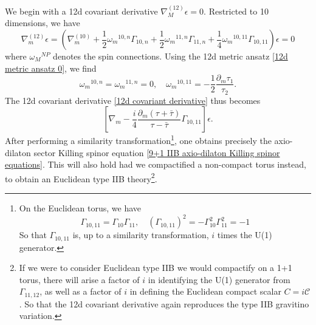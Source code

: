 We begin with a 12d covariant derivative $\nabla^{(12)}_M\epsilon = 0$.
Restricted to 10 dimensions, we have
\begin{equation}
\nabla^{(12)}_m\epsilon
=\left(
\nabla^{(10)}_m
+\frac{1}{2}\omega_m{}^{10,n}\Gamma_{10,n}
+\frac{1}{2}\omega_m{}^{11,n}\Gamma_{11,n}
+\frac{1}{4}\omega_m{}^{10,11}\Gamma_{10,11}\right)\epsilon = 0
\label{12d covariant derivative}
\end{equation}
where $\omega_{M}{}^{NP}$ denotes the spin connections.
Using the 12d metric ansatz \eqref{12d metric ansatz 0}, we find
\begin{equation}
\omega_m{}^{10,n}=\omega_m{}^{11,n}=0,\quad
\omega_m{}^{10,11} = -\frac{1}{2}\frac{\partial_m \tau_1}{\tau_2}.
\end{equation}
The 12d covariant derivative \eqref{12d covariant derivative} thus becomes
\begin{equation}
\left[
\nabla_m -\frac{i}{4}\frac{\partial_m(\tau+\bar\tau)}{\tau-\bar\tau}\Gamma_{10,11}
\right]\epsilon.
\end{equation}
After performing a similarity transformation\footnote{
On the Euclidean torus, we have
\begin{equation}
\Gamma_{10,11} = \Gamma_{10}\Gamma_{11},\quad
(\Gamma_{10,11})^2 
=-\Gamma_{10}^2\Gamma_{11}^2 = -1
\end{equation}
So that $\Gamma_{10,11}$ is, up to a similarity transformation, $i$ times the U(1) generator.
},
one obtains precisely the axio-dilaton sector Killing spinor equation \eqref{9+1 IIB axio-dilaton Killing spinor equations}.
This will also hold had we compactified a non-compact torus instead, to obtain an Euclidean type IIB theory\footnote{
If we were to consider Euclidean type IIB we would compactify on a 1+1 torus, there will arise a factor of $i$ in identifying the U(1) generator from $\Gamma_{11,12}$, as well as a factor of $i$ in defining the Euclidean compact scalar $C = i\mathcal C$. 
So that the 12d covariant derivative again reproduces the type IIB gravitino variation.
}.
